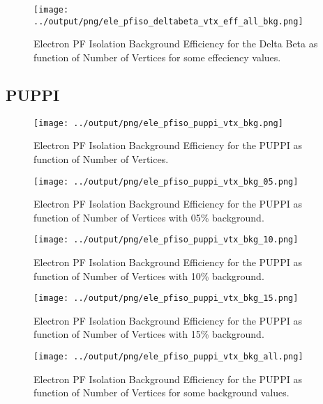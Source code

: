 \documentclass[11pt]{book}
\begin{document}
\begin{figure}[htb]
\centering
\texttt{[image: ../output/png/ele\_pfiso\_deltabeta\_vtx\_eff\_all\_bkg.png]}
\caption{Electron PF Isolation Background Efficiency for the Delta Beta as function of Number of Vertices for some effeciency values.}
\label{fig:ele_pfiso_vtx_eff_deltabeta_eff_all_bkg}
\end{figure}
\clearpage

\subsection{PUPPI}
\begin{figure}[htb]
\centering
\texttt{[image: ../output/png/ele\_pfiso\_puppi\_vtx\_bkg.png]}
\caption{Electron PF Isolation Background Efficiency for the PUPPI as function of Number of Vertices.}
\label{fig:ele_pfiso_vtx_bgk_puppi}
\end{figure}

\begin{figure}[htb]
\centering
\texttt{[image: ../output/png/ele\_pfiso\_puppi\_vtx\_bkg\_05.png]}
\caption{Electron PF Isolation Background Efficiency for the PUPPI as function of Number of Vertices with 05\% background.}
\label{fig:ele_pfiso_vtx_bkg_puppi_bkg_05}
\end{figure}

\begin{figure}[htb]
\centering
\texttt{[image: ../output/png/ele\_pfiso\_puppi\_vtx\_bkg\_10.png]}
\caption{Electron PF Isolation Background Efficiency for the PUPPI as function of Number of Vertices with 10\% background.}
\label{fig:ele_pfiso_vtx_bkg_puppi_bkg_10}
\end{figure}

\begin{figure}[htb]
\centering
\texttt{[image: ../output/png/ele\_pfiso\_puppi\_vtx\_bkg\_15.png]}
\caption{Electron PF Isolation Background Efficiency for the PUPPI as function of Number of Vertices with 15\% background.}
\label{fig:ele_pfiso_vtx_bkg_puppi_bkg_15}
\end{figure}

\begin{figure}[htb]
\centering
\texttt{[image: ../output/png/ele\_pfiso\_puppi\_vtx\_bkg\_all.png]}
\caption{Electron PF Isolation Background Efficiency for the PUPPI as function of Number of Vertices for some background values.}
\label{fig:ele_pfiso_vtx_bkg_puppi_bkg_all}
\end{figure}
\end{document}
